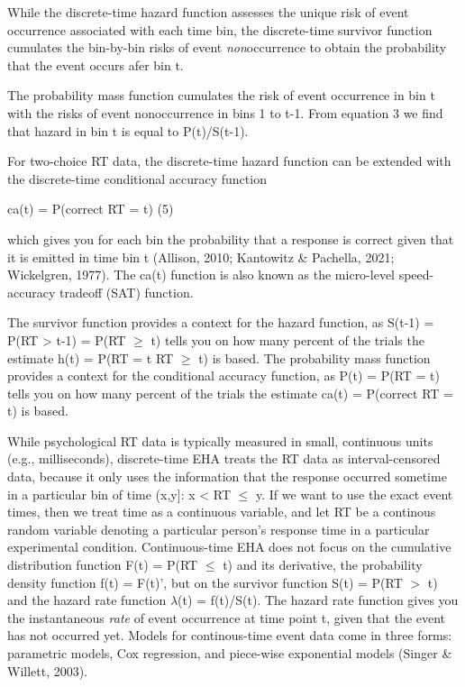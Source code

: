 \documentclass[
  man,floatsintext]{apa6}
\begin{document}
While the discrete-time hazard function assesses the unique risk of event occurrence associated with each time bin, the discrete-time survivor function cumulates the bin-by-bin risks of event \emph{non}occurrence to obtain the probability that the event occurs afer bin t.

The probability mass function cumulates the risk of event occurrence in bin t with the risks of event nonoccurrence in bins 1 to t-1. From equation 3 we find that hazard in bin t is equal to P(t)/S(t-1).

For two-choice RT data, the discrete-time hazard function can be extended with the discrete-time conditional accuracy function

\noindent ca(t) = P(correct \textbar{} RT = t) \hfill  (5)

\noindent which gives you for each bin the probability that a response is correct given that it is emitted in time bin t (Allison, 2010; Kantowitz \& Pachella, 2021; Wickelgren, 1977). The ca(t) function is also known as the micro-level speed-accuracy tradeoff (SAT) function.

The survivor function provides a context for the hazard function, as S(t-1) = P(RT \textgreater{} t-1) = P(RT \(\geq\) t) tells you on how many percent of the trials the estimate h(t) = P(RT = t\textbar{} RT \(\geq\) t) is based. The probability mass function provides a context for the conditional accuracy function, as P(t) = P(RT = t) tells you on how many percent of the trials the estimate ca(t) = P(correct \textbar{} RT = t) is based.

While psychological RT data is typically measured in small, continuous units (e.g., milliseconds), discrete-time EHA treats the RT data as interval-censored data, because it only uses the information that the response occurred sometime in a particular bin of time (x,y{]}: x \textless{} RT \(\leq\) y. If we want to use the exact event times, then we treat time as a continuous variable, and let RT be a continous random variable denoting a particular person's response time in a particular experimental condition. Continuous-time EHA does not focus on the cumulative distribution function F(t) = P(RT \(\leq\) t) and its derivative, the probability density function f(t) = F(t)', but on the survivor function S(t) = P(RT \(>\) t) and the hazard rate function \(\lambda\)(t) = f(t)/S(t). The hazard rate function gives you the instantaneous \emph{rate} of event occurrence at time point t, given that the event has not occurred yet. Models for continous-time event data come in three forms: parametric models, Cox regression, and piece-wise exponential models (Singer \& Willett, 2003).
\end{document}
